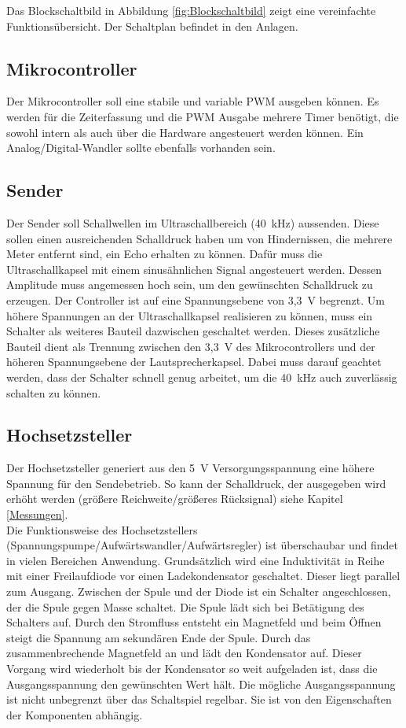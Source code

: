 Das Blockschaltbild in Abbildung \ref{fig:Blockschaltbild} zeigt eine vereinfachte Funktionsübersicht. Der Schaltplan befindet in den Anlagen.

\subsection{Mikrocontroller}
Der Mikrocontroller soll eine stabile und variable PWM ausgeben können. Es werden für die Zeiterfassung und die PWM Ausgabe mehrere Timer benötigt, die sowohl intern als auch über die Hardware angesteuert werden können. Ein Analog/Digital-Wandler sollte ebenfalls vorhanden sein.

\subsection{Sender}
Der Sender soll Schallwellen im Ultraschallbereich (40~kHz) aussenden. Diese sollen einen ausreichenden Schalldruck haben um von Hindernissen, die mehrere Meter entfernt sind, ein Echo erhalten zu können. Dafür muss die Ultraschallkapsel mit einem sinusähnlichen Signal angesteuert werden. Dessen Amplitude muss angemessen hoch sein, um den gewünschten Schalldruck zu erzeugen. Der Controller ist auf eine Spannungsebene von 3,3~V begrenzt. Um höhere Spannungen an der Ultraschallkapsel realisieren zu können, muss ein Schalter als weiteres Bauteil dazwischen geschaltet werden. Dieses zusätzliche Bauteil dient als Trennung zwischen den 3,3~V des Mikrocontrollers und der höheren Spannungsebene der Lautsprecherkapsel. Dabei muss darauf geachtet werden, dass der Schalter schnell genug arbeitet, um die 40~kHz auch zuverlässig schalten zu können.

\subsection{Hochsetzsteller}
Der Hochsetzsteller generiert aus den 5~V Versorgungsspannung eine höhere Spannung für den Sendebetrieb. So kann der Schalldruck, der ausgegeben wird erhöht werden (größere Reichweite/größeres Rücksignal) siehe Kapitel \ref{Messungen}.\\
Die Funktionsweise des Hochsetzstellers (Spannungspumpe/Aufwärtswandler/Aufwärtsregler) ist überschaubar und findet in vielen Bereichen Anwendung. Grundsätzlich wird eine Induktivität in Reihe mit einer Freilaufdiode vor einen Ladekondensator geschaltet. Dieser liegt parallel zum Ausgang. Zwischen der Spule und der Diode ist ein Schalter angeschlossen, der die Spule gegen Masse schaltet. Die Spule lädt sich bei Betätigung des Schalters auf. Durch den Stromfluss entsteht ein Magnetfeld und beim Öffnen steigt die Spannung am sekundären Ende der Spule. Durch das zusammenbrechende Magnetfeld an und lädt den Kondensator auf. Dieser Vorgang wird wiederholt bis der Kondensator so weit aufgeladen ist, dass die Ausgangsspannung den gewünschten Wert hält. Die mögliche Ausgangsspannung ist nicht unbegrenzt über das Schaltspiel regelbar. Sie ist von den Eigenschaften der Komponenten abhängig. 

